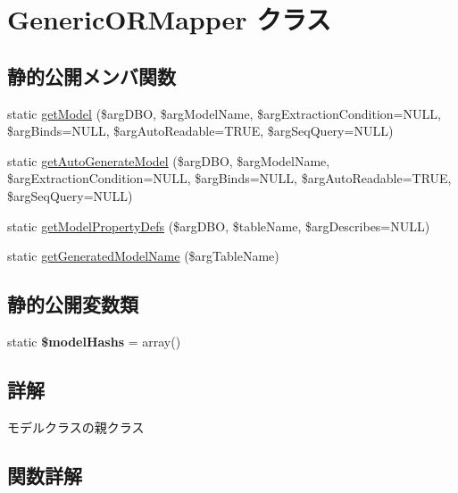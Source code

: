 \hypertarget{class_generic_o_r_mapper}{}\section{Generic\+O\+R\+Mapper クラス}
\label{class_generic_o_r_mapper}
\subsection*{静的公開メンバ関数}
\begin{DoxyCompactItemize}
\item 
static \hyperlink{class_generic_o_r_mapper_a3f833cdbc0cd07e51a73c173340a4121}{get\+Model} (\$arg\+D\+B\+O, \$arg\+Model\+Name, \$arg\+Extraction\+Condition=N\+U\+L\+L, \$arg\+Binds=N\+U\+L\+L, \$arg\+Auto\+Readable=T\+R\+U\+E, \$arg\+Seq\+Query=N\+U\+L\+L)
\item 
static \hyperlink{class_generic_o_r_mapper_a070c45b6a36844c8e1d678a8dda68478}{get\+Auto\+Generate\+Model} (\$arg\+D\+B\+O, \$arg\+Model\+Name, \$arg\+Extraction\+Condition=N\+U\+L\+L, \$arg\+Binds=N\+U\+L\+L, \$arg\+Auto\+Readable=T\+R\+U\+E, \$arg\+Seq\+Query=N\+U\+L\+L)
\item 
static \hyperlink{class_generic_o_r_mapper_a9adcced11d179909b4a30e00bd038d26}{get\+Model\+Property\+Defs} (\$arg\+D\+B\+O, \$table\+Name, \$arg\+Describes=N\+U\+L\+L)
\item 
static \hyperlink{class_generic_o_r_mapper_abf9b7bfb30b712e990c35e73125d51b2}{get\+Generated\+Model\+Name} (\$arg\+Table\+Name)
\end{DoxyCompactItemize}
\subsection*{静的公開変数類}
\begin{DoxyCompactItemize}
\item 
\hypertarget{class_generic_o_r_mapper_ab40f30f28d55eca6b0245190464f6b15}{}static {\bfseries \$model\+Hashs} = array()\label{class_generic_o_r_mapper_ab40f30f28d55eca6b0245190464f6b15}

\end{DoxyCompactItemize}


\subsection{詳解}
モデルクラスの親クラス 

\subsection{関数詳解}
\hypertarget{class_generic_o_r_mapper_a070c45b6a36844c8e1d678a8dda68478}{}
